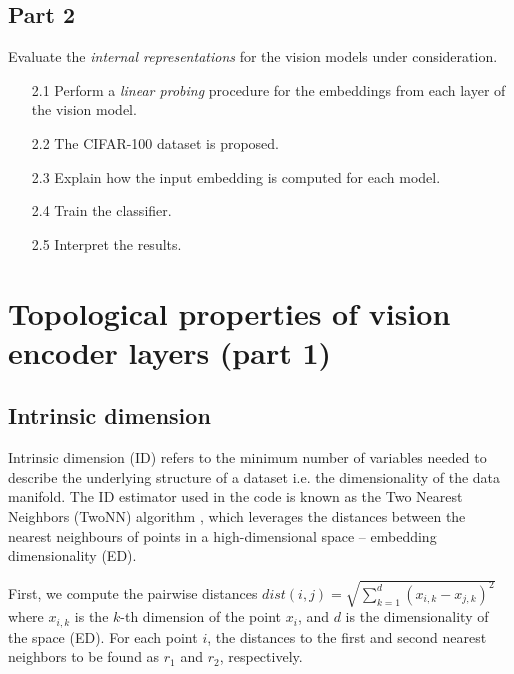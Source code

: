\documentclass[
  11pt,
  a4paper,
  onecolumn]{article}
\begin{document}
\subsection*{Part 2}

Evaluate the \textit{internal representations} for the vision models under consideration.

\begin{enumerate}
  \item[2.1] Perform a \textit{linear probing} procedure for the embeddings from each layer of the vision model.
  \item[2.2] The CIFAR-100 dataset is proposed.
  \item[2.3] Explain how the input embedding is computed for each model. 
  \item[2.4] Train the classifier.
  \item[2.5] Interpret the results.
\end{enumerate}




\section{Topological properties of vision encoder layers (part 1)}\label{part_1}

\subsection{Intrinsic dimension}

Intrinsic dimension (ID) refers to the minimum number of variables needed to describe the underlying structure of a dataset i.e. the dimensionality of the data manifold. The ID estimator used in the code is known as the Two Nearest Neighbors (TwoNN) algorithm \cite{facco2017estimating}, which leverages the distances between the nearest neighbours of points in a high-dimensional space -- embedding dimensionality (ED).

First, we compute the pairwise distances $dist(i, j) = \sqrt{\sum_{k=1}^{d} (x_{i,k} - x_{j,k})^2}$ where $x_{i,k}$ is the $k$-th dimension of the point $x_i$, and $d$ is the dimensionality of the space (ED). For each point $i$, the distances to the first and second nearest neighbors to be found as $r_1$ and $r_2$, respectively.
\end{document}
